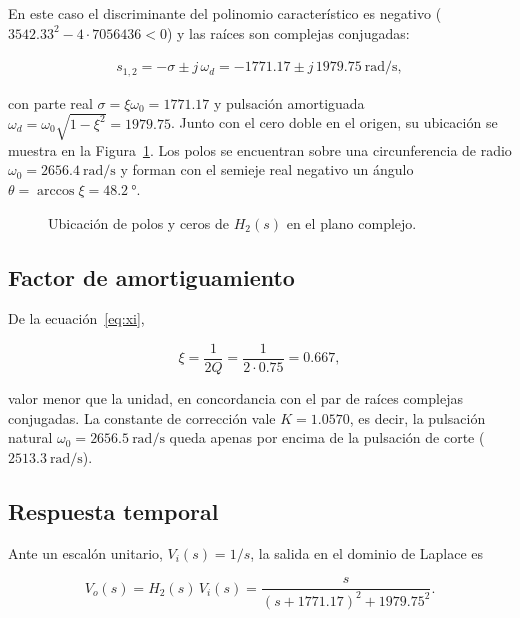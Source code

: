 En este caso el discriminante del polinomio característico es negativo
($\num{3542.33}^2 - 4 \cdot \num{7056436} < 0$) y las raíces son complejas conjugadas:

\begin{gather*}
  s_{1,2} = -\sigma \pm j\,\omega_d = \num{-1771.17} \pm j\,\num{1979.75}\ \unit{\radian\per\second},
\end{gather*}

con parte real $\sigma = \xi\omega_0 = \num{1771.17}$ y pulsación amortiguada
$\omega_d = \omega_0\sqrt{1 - \xi^2} = \num{1979.75}$. Junto con el cero doble en el origen, su ubicación
se muestra en la Figura~\ref{fig:polos-q075}. Los polos se encuentran sobre una circunferencia de radio
$\omega_0 = \qty{2656.4}{\radian\per\second}$ y forman con el semieje real negativo un ángulo
$\theta = \arccos\xi = \qty{48.2}{\degree}$.

\begin{figure}[!ht]
  \centering
  
  \caption{Ubicación de polos y ceros de $H_2(s)$ en el plano complejo.}
  \label{fig:polos-q075}
\end{figure}

\subsection{Factor de amortiguamiento}

De la ecuación~\eqref{eq:xi},

\begin{equation}
  \xi = \frac{1}{2Q} = \frac{1}{2 \cdot \num{0.75}} = \num{0.667},
  \label{eq:xi-q075}
\end{equation}

valor menor que la unidad, en concordancia con el par de raíces complejas conjugadas. La constante de
corrección vale $K = \num{1.0570}$, es decir, la pulsación natural
$\omega_0 = \qty{2656.5}{\radian\per\second}$ queda apenas por encima de la pulsación de corte
($\qty{2513.3}{\radian\per\second}$).

\subsection{Respuesta temporal}

Ante un escalón unitario, $V_i(s) = 1/s$, la salida en el dominio de Laplace es

\begin{equation}
  V_o(s) = H_2(s)\, V_i(s)
         = \frac{s}{\left(s + \num{1771.17}\right)^2 + \num{1979.75}^2}.
  \label{eq:vo-q075}
\end{equation}

